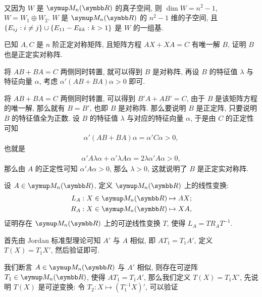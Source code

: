 \documentclass{ctexart}
\begin{document}
\begin{exercise}[resume=exer]
\begin{answer}
\begin{align*}
            \end{align*}
            又因为 $ W $ 是 $ \MM $ 的真子空间, 则 $ \dim W = n^{2} - 1 $, $ W = W_{1} \oplus W_{2} $. 
            $ W $ 是 $ \MM $ 的 $ n^{2} - 1 $ 维的子空间, 且 $ \qty{E_{ij} : i \ne j} \cup \qty{E_{11} - E_{kk} : k > 1} $ 是 $ W $ 的一组基.
        \end{answer}
        \item 已知 $ A, C $ 是 $ n $ 阶正定对称矩阵, 且矩阵方程 $ AX + XA = C $ 有唯一解 $ B $, 证明 $ B $ 也是正定实对称阵. 
        \begin{hint}
            将 $ AB + BA = C $ 两侧同时转置, 就可以得到 $ B $ 是对称阵, 再设 $ B $ 的特征值 $ \lambda $ 与特征向量 $ \alpha $, 考虑 $ \alpha'(AB + BA)\alpha > 0 $ 即可.
        \end{hint}
        \begin{answer}
            将 $ AB + BA = C $ 两侧同时转置, 可以得到 $ B'A + AB' = C $, 由于 $ B $ 是该矩阵方程的唯一解, 那么就有 $ B = B' $, 也即 $ B $ 是对称阵. 那么要说明 $ B $ 是正定阵, 只要说明 $ B $ 的特征值全为正数. 设 $ B $ 的特征值 $ \lambda $ 与对应的特征向量 $ \alpha $, 于是由 $ C $ 的正定性可知
            \begin{align*}
                \alpha'(AB + BA)\alpha = \alpha'C\alpha > 0,
            \end{align*}
            也就是
            \begin{align*}
                \alpha'A\lambda\alpha + \alpha'\lambda A\alpha = 2\lambda\alpha' A\alpha > 0,
            \end{align*}
            那么由 $ A $ 的正定性可知 $ \alpha' A\alpha > 0 $, 那么 $ \lambda > 0 $, 这就说明了 $ B $ 是正定实对称阵. 
        \end{answer}
        \item 设 $ A \in \MM $, 定义 $ \MM $ 上的线性变换:
        \begin{align*}
            L_{A} : X \in \MM \mapsto AX;\\
            R_{A} : X \in \MM \mapsto XA,
        \end{align*}
        证明存在 $ \MM $ 上的可逆线性变换 $ T $, 使得 $ L_{A} = TR_{A}T^{-1} $.
        \begin{hint}
            首先由 Jordan 标准型理论可知 $ A' $ 与 $ A $ 相似, 即 $ AT_{1} = T_{1}A' $, 定义 $ T(X) = T_{1}X' $, 然后验证即可. 
        \end{hint}
        \begin{answer}
            我们断言 $ A \in \MM $ 与 $ A' $ 相似, 则存在可逆阵 $ T_{1} \in \MM $, 使得 $ AT_{1} = T_{1}A' $, 那么我们定义 $ T(X) = T_{1}X' $, 先说明 $ T(X) $ 是可逆变换: 令 $ T_{2} : X \mapsto (T^{-1}_{1}X)' $, 可以验证

\end{answer}
\end{exercise}
\end{document}
